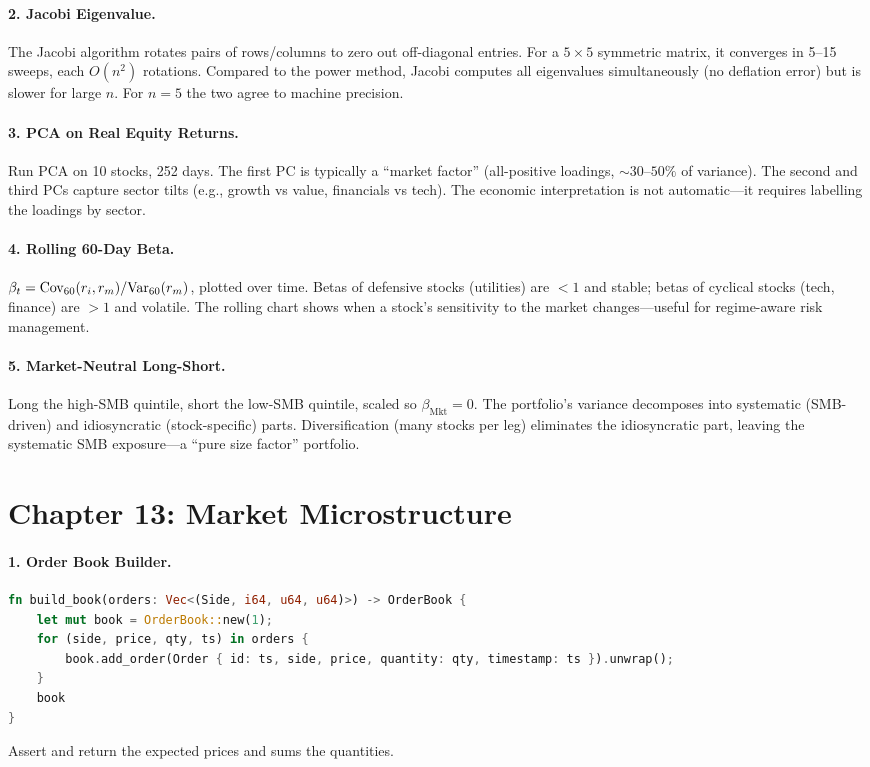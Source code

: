 \paragraph{2. Jacobi Eigenvalue.}
The Jacobi algorithm rotates pairs of rows/columns to zero out
off-diagonal entries. For a $5 \times 5$ symmetric matrix, it
converges in 5--15 sweeps, each $O(n^2)$ rotations. Compared to the
power method, Jacobi computes all eigenvalues simultaneously (no
deflation error) but is slower for large $n$. For $n = 5$ the two
agree to machine precision.

\paragraph{3. PCA on Real Equity Returns.}
Run PCA on 10 stocks, 252 days. The first PC is typically a ``market
factor'' (all-positive loadings, $\sim 30$--$50\%$ of variance). The
second and third PCs capture sector tilts (e.g., growth vs value,
financials vs tech). The economic interpretation is not
automatic---it requires labelling the loadings by sector.

\paragraph{4. Rolling 60-Day Beta.}
$\beta_t = \text{Cov}_{60}(r_i, r_m) / \text{Var}_{60}(r_m)$, plotted over time.
Betas of defensive stocks (utilities) are $< 1$ and stable; betas
of cyclical stocks (tech, finance) are $> 1$ and volatile. The
rolling chart shows when a stock's sensitivity to the market
changes---useful for regime-aware risk management.

\paragraph{5. Market-Neutral Long-Short.}
Long the high-SMB quintile, short the low-SMB quintile, scaled so
$\beta_{\text{Mkt}} = 0$. The portfolio's variance decomposes into
systematic (SMB-driven) and idiosyncratic (stock-specific) parts.
Diversification (many stocks per leg) eliminates the idiosyncratic
part, leaving the systematic SMB exposure---a ``pure size factor''
portfolio.

\section*{Chapter 13: Market Microstructure}

\paragraph{1. Order Book Builder.}
\begin{lstlisting}[language=Rust]
fn build_book(orders: Vec<(Side, i64, u64, u64)>) -> OrderBook {
    let mut book = OrderBook::new(1);
    for (side, price, qty, ts) in orders {
        book.add_order(Order { id: ts, side, price, quantity: qty, timestamp: ts }).unwrap();
    }
    book
}
\end{lstlisting}
Assert  and  return the expected
prices and  sums the quantities.

